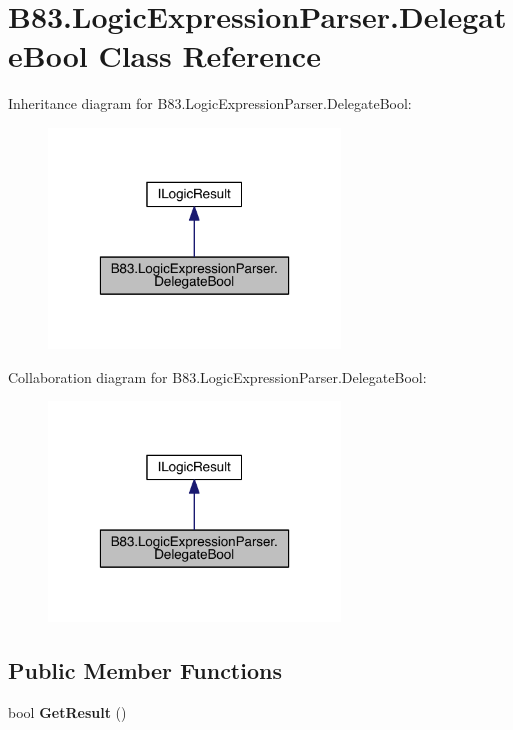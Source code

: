\hypertarget{class_b83_1_1_logic_expression_parser_1_1_delegate_bool}{}\section{B83.\+Logic\+Expression\+Parser.\+Delegate\+Bool Class Reference}
\label{class_b83_1_1_logic_expression_parser_1_1_delegate_bool}


Inheritance diagram for B83.\+Logic\+Expression\+Parser.\+Delegate\+Bool\+:\nopagebreak
\begin{figure}[H]
\begin{center}
\leavevmode
\includegraphics[width=220pt]{class_b83_1_1_logic_expression_parser_1_1_delegate_bool__inherit__graph}
\end{center}
\end{figure}


Collaboration diagram for B83.\+Logic\+Expression\+Parser.\+Delegate\+Bool\+:\nopagebreak
\begin{figure}[H]
\begin{center}
\leavevmode
\includegraphics[width=220pt]{class_b83_1_1_logic_expression_parser_1_1_delegate_bool__coll__graph}
\end{center}
\end{figure}
\subsection*{Public Member Functions}
\begin{DoxyCompactItemize}
\item 
bool {\bfseries Get\+Result} ()\hypertarget{class_b83_1_1_logic_expression_parser_1_1_delegate_bool_a89ee2921ce6153017d8f1a0f98cc5e23}{}\label{class_b83_1_1_logic_expression_parser_1_1_delegate_bool_a89ee2921ce6153017d8f1a0f98cc5e23}

\end{DoxyCompactItemize}
